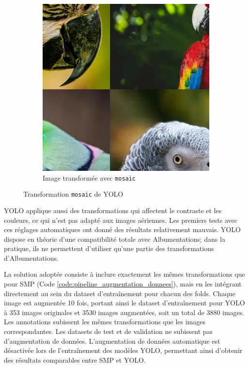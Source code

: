 \begin{figure}[H]
\begin{subfigure}[b]{0.49\textwidth}
        \centering
        \includegraphics[width=\textwidth]{02-main/figures/ch3/ch36_augmentations_00b_yolo_exemple1_mosaic.png}
        \caption{Image transformée avec \texttt{mosaic}}
        \label{fig:ch36_augmentations_00b_yolo_exemple1_mosaic}
    \end{subfigure}
    \caption{Transformation \texttt{mosaic} de YOLO}
    \label{fig:ch36_augmentation_donnees_yolo_mosaic}
\end{figure}

YOLO applique aussi des transformations qui affectent le contraste et les couleurs, ce qui n'est pas adapté aux images aériennes. Les premiers tests avec ces réglages automatiques ont donné des résultats relativement mauvais. YOLO dispose en théorie d'une compatibilité totale avec Albumentations; dans la pratique, ils ne permettent d'utiliser qu'une partie des transformations d'Albumentations.

La solution adoptée consiste à inclure exactement les mêmes transformations que pour SMP (Code \ref{code:pipeline_augmentation_donnees}), mais en les intégrant directement au sein du dataset d'entraînement pour chacun des folds. Chaque image est augmentée 10 fois, portant ainsi le dataset d'entraînement pour YOLO à 353 images originales et 3530 images augmentées, soit un total de 3880 images. Les annotations subissent les mêmes transformations que les images correspondantes. Les datasets de test et de validation ne subissent pas d'augmentation de données. L'augmentation de données automatique est désactivée lors de l'entraînement des modèles YOLO, permettant ainsi d'obtenir des résultats comparables entre SMP et YOLO.

